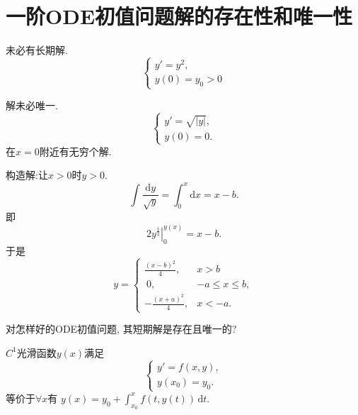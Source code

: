 
\section{一阶ODE初值问题解的存在性和唯一性}

\begin{example}
  未必有长期解.
  \begin{equation}
    \begin{cases}
      y' = y^{2}, \\
      y(0) = y_0 > 0
    \end{cases}
  \end{equation}
\end{example}

\begin{example}
  解未必唯一.
  \begin{equation}
    \begin{cases}
      y' = \sqrt{\left| y \right|}, \\
      y(0) = 0.
    \end{cases}
  \end{equation}
  在$x=0$附近有无穷个解.

  构造解:让$x>0$时$y>0$.
  \begin{equation}
    \int \frac{\mathrm{d} y}{\sqrt{y}} = \int_{0}^{x} \mathrm{d}x = x- b.
  \end{equation}
  即
  \begin{equation}
   \left. 2 y^{\frac{1}{2}}\right|_{0}^{y(x)} = x-b.
  \end{equation}
  于是
  \begin{equation}
    y = 
    \begin{cases}
      \frac{\left( x-b \right)^{2}}{4}, & x>b \\
      \ 0 , & -a \le x \le b, \\
      - \frac{\left( x+a \right)^{2}}{4}, & x< -a.
    \end{cases}
  \end{equation}
\end{example}

对怎样好的ODE初值问题, 其短期解是存在且唯一的?

\begin{proposition}
  $C^{1}$光滑函数$y(x)$满足
  \begin{equation}
    \begin{cases}
      y' = f(x,y), \\
      y(x_0) = y_0.
    \end{cases}
  \end{equation}
  等价于$\forall x$有 $y(x) = y_0 + \int _{x_0}^{x} f(t,y(t))\, \mathrm{d} t$.
\end{proposition}

